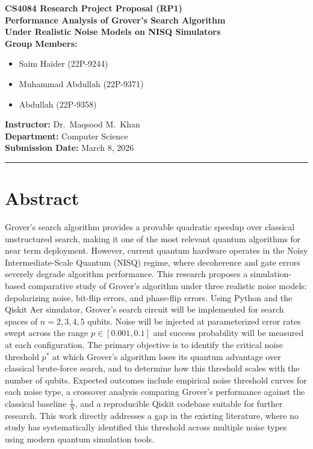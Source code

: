 \documentclass[12pt, a4paper]{article}
\begin{document}
\begin{center}
  {\large \textbf{CS4084 Research Project Proposal (RP1)}}\\[10pt]
  {\LARGE \textbf{Performance Analysis of Grover's Search Algorithm\\
  Under Realistic Noise Models on NISQ Simulators}}\\[16pt]

  \textbf{Group Members:}\\[4pt]
  \begin{itemize}[leftmargin=3cm, label=\textbullet]
    \item Saim Haider (22P-9244)
    \item Muhammad Abdullah (22P-9371)
    \item Abdullah (22P-9358)
  \end{itemize}

  \vspace{6pt}
  \textbf{Instructor:} Dr.\ Maqsood M.\ Khan\\
  \textbf{Department:} Computer Science\\
  \textbf{Submission Date:} March 8, 2026
\end{center}

\hrule
\vspace{12pt}

\section*{Abstract}

Grover's search algorithm provides a provable quadratic speedup over classical
unstructured search, making it one of the most relevant quantum algorithms for near
term deployment. However, current quantum hardware operates in the Noisy
Intermediate-Scale Quantum (NISQ) regime, where decoherence and gate errors severely
degrade algorithm performance. This research proposes a simulation-based comparative
study of Grover's algorithm under three realistic noise models: depolarizing noise,
bit-flip errors, and phase-flip errors. Using Python and the Qiskit Aer simulator,
Grover's search circuit will be implemented for search spaces of $n = 2, 3, 4, 5$
qubits. Noise will be injected at parameterized error rates swept across the range
$p \in [0.001, 0.1]$ and success probability will be measured at each configuration.
The primary objective is to identify the critical noise threshold $p^{*}$ at which
Grover's algorithm loses its quantum advantage over classical brute-force search, and
to determine how this threshold scales with the number of qubits. Expected outcomes
include empirical noise threshold curves for each noise type, a crossover analysis
comparing Grover's performance against the classical baseline $\frac{1}{N}$, and a
reproducible Qiskit codebase suitable for further research. This work directly
addresses a gap in the existing literature, where no study has systematically
identified this threshold across multiple noise types using modern quantum simulation
tools.
\end{document}
